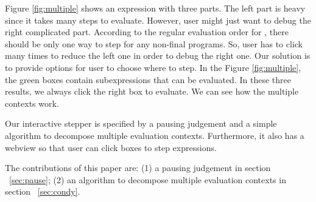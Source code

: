 Figure \ref{fig:multiple} shows an expression with three parts. The left part is heavy since it takes many steps to evaluate. However, user might just want to debug the right complicated part. According to the regular evaluation order for \Hazel, there should be only one way to step for any non-final programs. So, user has to click many times to reduce the left one in order to debug the right one. Our solution is to provide options for user to choose where to step. In the Figure \ref{fig:multiple}, the green boxes contain subexpressions that can be evaluated. In these three results, we always click the right box to evaluate. We can see how the multiple contexts work.

Our interactive stepper is specified by a pausing judgement and a simple algorithm to decompose multiple evaluation contexts. Furthermore, it also has a webview so that user can click boxes to step expressions.

 The contributions of this paper are: (1) a pausing judgement in section ~\ref{sec:pause}; (2) an algorithm to decompose multiple evaluation contexts in section ~\ref{sec:condy}.
